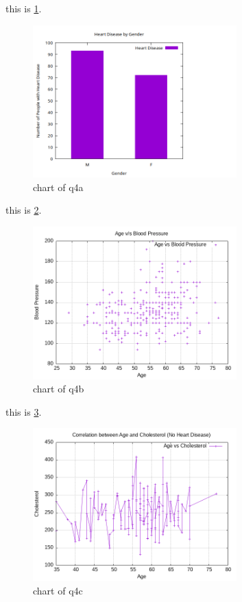 \documentclass{article}
\begin{document}
this is \ref{fig:1}. \\
\begin{figure}[ht]
    \centering
    \includegraphics[width=0.7\textwidth]{4a.png}  
    \caption{chart of q4a}
    \label{fig:1}
\end{figure}
this is \ref{fig:2}. \\
\begin{figure}[ht]
    \centering
    \includegraphics[width=0.7\textwidth]{4b.png}  
    \caption{chart of q4b}
    \label{fig:2}
\end{figure}
this is \ref{fig:3}. \\
\begin{figure}[ht]
    \centering
    \includegraphics[width=0.7\textwidth]{4c.png} 
    \caption{chart of q4c}
    \label{fig:3}
\end{figure}
\end{document}
